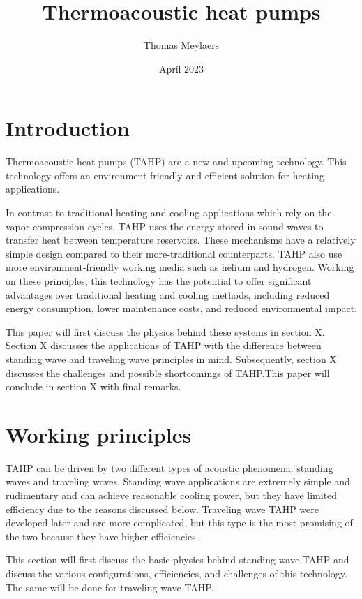 \documentclass[a4paper]{article}
\title{Thermoacoustic heat pumps}
\author{Thomas Meylaers}
\date{April 2023}
\newcommand{\newpara}
    {
      \bigbreak{}
      \noindent
    }
\begin{document}
\maketitle

\newpage

\begin{abstract}

\end{abstract}

\newpage

\tableofcontents

\newpage


\section{Introduction} %
Thermoacoustic heat pumps (TAHP) are a new and upcoming technology. This technology offers an environment-friendly and efficient solution for heating applications.
\newpara{}
In contrast to traditional heating and cooling applications which rely on the vapor compression cycles, TAHP uses the energy stored in sound waves to transfer heat between temperature reservoirs. These mechanisms have a relatively simple design compared to their more-traditional counterparts. TAHP also use more environment-friendly working media such as helium and hydrogen.
Working on these principles, this technology has the potential to offer significant advantages over traditional heating and cooling methods, including reduced energy consumption, lower maintenance costs, and reduced environmental impact.\cite{powerofsound}
\newpara{}
This paper will first discuss the physics behind these systems in section X. Section X discusses the applications of TAHP with the difference between standing wave and traveling wave principles in mind. Subsequently, section X discusses the challenges and possible shortcomings of TAHP.\@ This paper will conclude in section X with final remarks.

\section{Working principles}
TAHP can be driven by two different types of acoustic phenomena: standing waves and traveling waves. Standing wave applications are extremely simple and rudimentary and can achieve reasonable cooling power, but they have limited efficiency due to the reasons discussed below. Traveling wave TAHP were developed later and are more complicated, but this type is the most promising of the two because they have higher efficiencies.
\newpara{}
This section will first discuss the basic physics behind standing wave TAHP and discuss the various configurations, efficiencies, and challenges of this technology. The same will be done for traveling wave TAHP.\@
\end{document}
